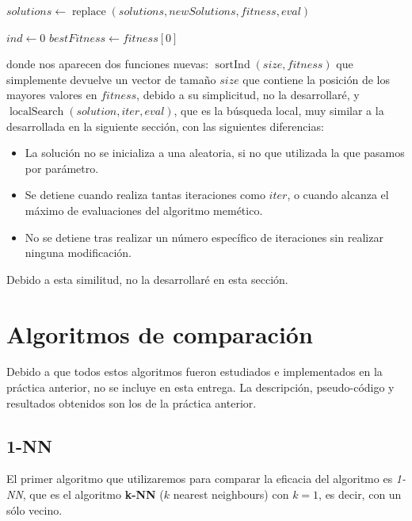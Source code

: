 \documentclass[11pt,a4paper]{article}
\begin{document}
\begin{scriptsize}
\begin{algorithm}[H]
{{			
		}		
		
		$solutions \gets \operatorname{replace}(solutions, newSolutions, fitness, eval)$ \;
		}
	
	$ind \gets 0$ \;
	$bestFitness \gets fitness[0]$ \;
	
	 \;
\end{algorithm}
\end{scriptsize}

donde nos aparecen dos funciones nuevas: $\operatorname{sortInd}(size, fitness)$ que simplemente devuelve un vector de tamaño $size$ que contiene la posición de los mayores valores en $fitness$, debido a su simplicitud, no la desarrollaré, y $\operatorname{localSearch}(solution, iter, eval)$, que es la búsqueda local, muy similar a la desarrollada en la siguiente sección, con las siguientes diferencias:
\begin{itemize}
\item La solución no se inicializa a una aleatoria, si no que utilizada la que pasamos por parámetro.
\item Se detiene cuando realiza tantas iteraciones como $iter$, o cuando alcanza el máximo de evaluaciones del algoritmo memético.
\item No se detiene tras realizar un número específico de iteraciones sin realizar ninguna modificación.
\end{itemize}
Debido a esta similitud, no la desarrollaré en esta sección.

\newpage
\section{Algoritmos de comparación}

Debido a que todos estos algoritmos fueron estudiados e implementados en la práctica anterior, no se incluye en esta entrega. La descripción, pseudo-código y resultados obtenidos son los de la práctica anterior.

\subsection{1-NN}

El primer algoritmo que utilizaremos para comparar la eficacia del algoritmo es \emph{1-NN}, que es el algoritmo \textbf{k-NN} ($k$ nearest neighbours) con $k = 1$, es decir, con un sólo vecino.
\end{document}
